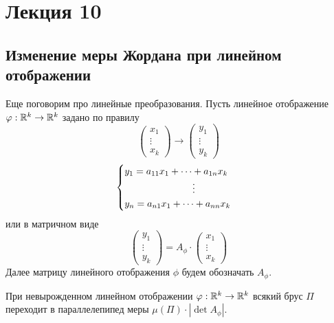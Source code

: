 \section{Лекция 10}
\subsection{Изменение меры Жордана при линейном отображении}
Еще поговорим про линейные преобразования. Пусть линейное отображение $\phi: \R^k\to \R^k$ задано по правилу
\[\begin{pmatrix}
    x_1\\
    \vdots\\
    x_k
\end{pmatrix}\to
\begin{pmatrix}
    y_1\\
    \vdots\\
    y_k
\end{pmatrix} \]
\[\begin{cases}
    y_1=a_{11} x_1+\dots+a_{1n}x_k\\
    \tab[2.5cm]\vdots\\
    y_n=a_{n1}x_1+\dots+a_{nn}x_k
\end{cases}\]
или в матричном виде
\[\begin{pmatrix}
    y_1\\
    \vdots\\
    y_k
\end{pmatrix}=A_{\phi}\cdot \begin{pmatrix}
    x_1\\
    \vdots\\
    x_k
\end{pmatrix}\]
Далее матрицу линейного отображения $\phi$ будем обозначать $A_{\phi}$.
\begin{statement}
    При невырожденном линейном отображении $\phi:\R^k\to \R^k$ всякий брус $\Pi$ переходит в параллелепипед меры $\mu(\Pi)\cdot |\det{A_{\phi}}|$.
\end{statement}
